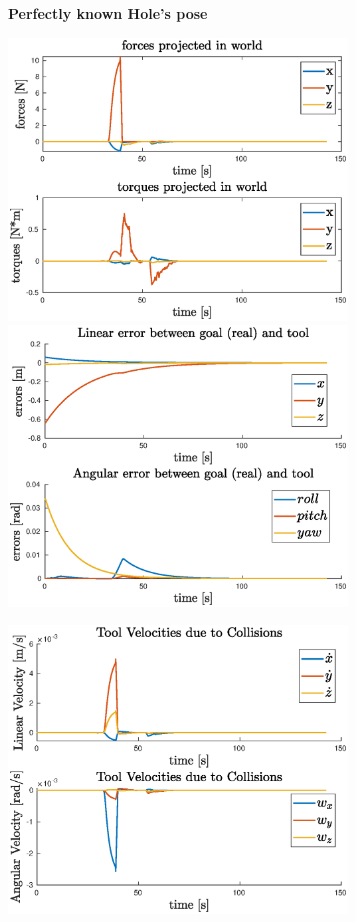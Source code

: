 \begin{figure}[H]
	\centering
	\textbf{Perfectly known Hole's pose}\\
	\vspace{8px}
	\centerline{
		\includegraphics[width=9cm]{NOERROR/forces.eps}
		\includegraphics[width=9cm]{NOERROR/error.eps}
	}
	\vspace{6px}
	\centerline{
		\includegraphics[width=9cm]{NOERROR/collisions.eps}
}
\end{figure}
